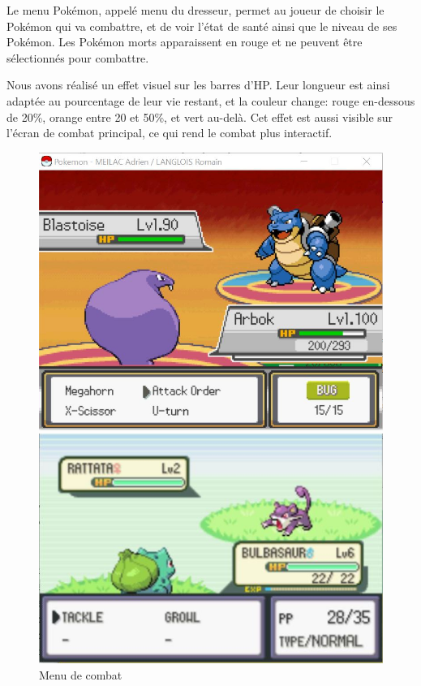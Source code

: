 \documentclass[a4paper,twoside, openany,11pt]{book}
\begin{document}
Le menu Pokémon, appelé menu du dresseur, permet au joueur de choisir le Pokémon qui va combattre, et de voir l'état de santé ainsi que le niveau de ses Pokémon. Les Pokémon morts apparaissent en rouge et ne peuvent être sélectionnés pour combattre. 

Nous avons réalisé un effet visuel sur les barres d'HP. Leur longueur est ainsi adaptée au pourcentage de leur vie restant, et la couleur change: rouge en-dessous de 20\%, orange entre 20 et 50\%, et vert au-delà. Cet effet est aussi visible sur l'écran de combat principal, ce qui rend le combat plus interactif. 

\begin{figure}[!h]
\begin{minipage}{0.49\textwidth}
\includegraphics[scale = 0.6]{Images/fightMenu.jpg}
\end{minipage}
\begin{minipage}{0.49\textwidth}
\includegraphics[scale = 0.84]{Images/vrai_jeu_fightMenu.jpg}
\end{minipage}
\caption{Menu de combat}
\end{figure}
\end{document}

